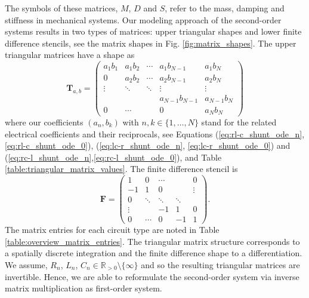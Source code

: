 \documentclass[a4paper, 10pt, twoside, twocolumn]{scrartcl}
\begin{document}
The symbols of these matrices, $M$, $D$ and $S$, refer to the mass, damping and stiffness in mechanical systems. Our modeling approach of the second-order systems results in two types of matrices: upper triangular shapes and lower finite difference stencils, see the matrix shapes in Fig. \ref{fig:matrix_shapes}. The upper triangular matrices have a shape as
\begin{equation}
	\mathbf{T}_{a,b} = 
	\begin{pmatrix}
		a_{1} b_{1} & a_{1} b_{2} & \cdots &  a_{1} b_{N-1} & a_{1} b_{N} \\
		0 			& a_{2} b_{2} & \cdots &  a_{2} b_{N-1} & a_{2} b_{N} \\
		\vdots			& \ddots	  & \ddots &  \vdots        & 	\vdots	  \\
		&			  &        & a_{N-1} b_{N-1}& a_{N-1} b_{N} \\
		0			&	\cdots		  &        &	0            & a_{N} b_{N} 
	\end{pmatrix}
	\label{eq:triangular_matrix} 
\end{equation}
where our coefficients $(a_{n}, b_{k})$ with $n,k \in \{1,\ldots,N\}$ stand for the related electrical coefficients and their reciprocals, see Equations (\ref{eq:rl-c_shunt_ode_n}, \ref{eq:rl-c_shunt_ode_0}), (\ref{eq:lc-r_shunt_ode_n}, \ref{eq:lc-r_shunt_ode_0}) and (\ref{eq:rc-l_shunt_ode_n},\ref{eq:rc-l_shunt_ode_0}), and Table \ref{table:triangular_matrix_values}. The finite difference stencil is
\begin{equation}
	\mathbf{F} = 
	\begin{pmatrix}
		1 & 0 & \cdots &  &  0\\
		-1 			& 1 & 0 &   & \vdots  \\
		0 & \ddots	  & \ddots & \ddots  & 	 \\
		\vdots &			  &     -1  & 1 &  0 \\
		0 &	\cdots		  &     0   & -1  & 1 
	\end{pmatrix} 
	\textbf{.}
	\label{eq:finite_diff_stencil} 
\end{equation}
The matrix entries for each circuit type are noted in Table \ref{table:overview_matrix_entries}. The triangular matrix structure corresponds to a spatially discrete integration and the finite difference shape to a differentiation.  We assume, $R_{n}$, $L_{n}$, $C_{n} \in \mathbb{R}_{>0} \setminus \{\infty\}$ and so the resulting triangular matrices are invertible. Hence, we are able to reformulate the second-order system via inverse matrix multiplication as first-order system. 
\end{document}
